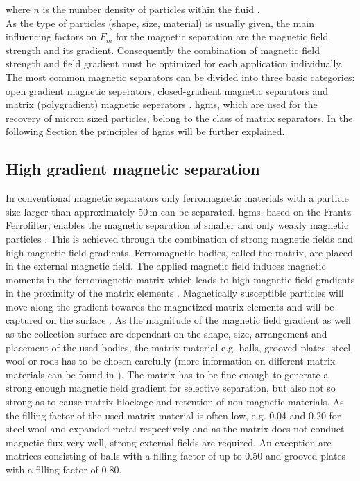 where $n$ is the number density of particles within the fluid \cite{choomphon2017simulation}\cite{moeser2004high}\cite{fletcher1991fine}. \\
As the type of particles (shape, size, material) is usually given, the main influencing factors on $F_{m}$ for the magnetic separation are the magnetic field strength and its gradient. Consequently the combination of magnetic field strength and field gradient must be optimized for each application individually. The most common magnetic separators can be divided into three basic categories: open gradient magnetic seperators, closed-gradient magnetic separators and matrix (polygradient) magnetic seperators \cite{svoboda2004magnetic}. \Gls{hgms}, which are used for the recovery of micron sized particles, belong to the class of matrix separators. In the following Section the principles of \gls{hgms} will be further explained.  


\subsection{High gradient magnetic separation}
\label{subsec:HGMS}
In conventional magnetic separators only ferromagnetic materials with a particle size larger than approximately 50\,\textmu m can be separated. \Gls{hgms}, based on the Frantz Ferrofilter, enables the magnetic separation of smaller and only weakly magnetic particles \cite{frantz1937patent} \cite{ge2017magnetic}. This is achieved through the combination of strong magnetic fields and high magnetic field gradients. Ferromagnetic bodies, called the matrix, are placed in the external magnetic field. The applied magnetic field induces magnetic moments in the ferromagnetic matrix which leads to high magnetic field gradients in the proximity of the matrix elements \cite{shukla2006process}. Magnetically susceptible particles will move along the gradient towards the magnetized matrix elements and will be captured on the surface \cite{hoffmann2002novel}. As the magnitude of the magnetic field gradient as well as the collection surface are dependant on the shape, size, arrangement and placement of the used bodies, the matrix material e.g. balls, grooved plates, steel wool or rods has to be chosen carefully (more information on different matrix materials can be found in \cite{iacob2002high}\cite{kim2013effects}\cite{takayasu1981matrices}). The matrix has to be fine enough to generate a strong enough magnetic field gradient for selective separation, but also not so strong as to cause matrix blockage and retention of non-magnetic materials. As the filling factor of the used matrix material is often low, e.g. 0.04 and 0.20 for steel wool and expanded metal respectively and as the matrix does not conduct magnetic flux very well, strong external fields are required. An exception are matrices consisting of balls with a filling factor of up to 0.50 and grooved plates with a filling factor of 0.80. 


